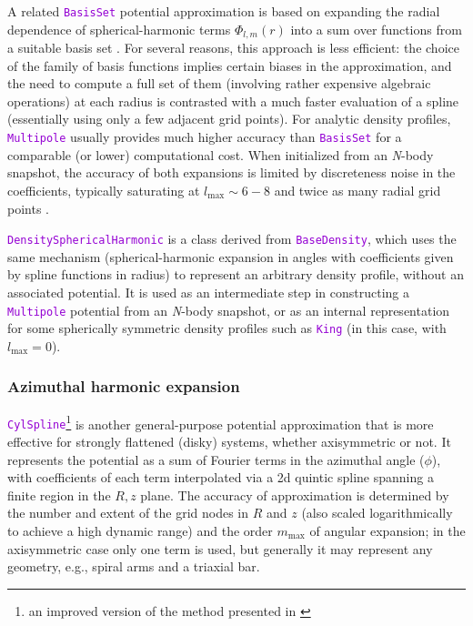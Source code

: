 \documentclass[12pt]{article}
\newcommand{\Nbody}{\textsl{N}-body\xspace}
\newcommand{\ttt}[1]{\textcolor{darkviolet}{\texttt{#1}}}
\begin{document}
A related \ttt{BasisSet} potential approximation is based on expanding the radial dependence of spherical-harmonic terms $\Phi_{l,m}(r)$ into a sum over functions from a suitable basis set \cite{HernquistOstriker1992,Zhao1996}. For several reasons, this approach is less efficient: the choice of the family of basis functions implies certain biases in the approximation, and the need to compute a full set of them (involving rather expensive algebraic operations) at each radius is contrasted with a much faster evaluation of a spline (essentially using only a few adjacent grid points). For analytic density profiles, \ttt{Multipole} usually provides much higher accuracy than \ttt{BasisSet} for a comparable (or lower) computational cost. When initialized from an \Nbody snapshot, the accuracy of both expansions is limited by discreteness noise in the coefficients, typically saturating at $l_\mathrm{max} \sim 6-8$ and twice as many radial grid points \cite{Sanders2020}.

\ttt{DensitySphericalHarmonic} is a class derived from \ttt{BaseDensity}, which uses the same mechanism (spherical-harmonic expansion in angles with coefficients given by spline functions in radius) to represent an arbitrary density profile, without an associated potential. It is used as an intermediate step in constructing a \ttt{Multipole} potential from an \Nbody snapshot, or as an internal representation for some spherically symmetric density profiles such as \ttt{King} (in this case, with $l_\mathrm{max}=0$).

\subsubsection{Azimuthal harmonic expansion}  \label{sec:PotentialCylSpline}

\ttt{CylSpline}\footnote{an improved version of the method presented in \cite{VasilievAthanassoula2015}} is another general-purpose potential approximation that is more effective for strongly flattened (disky) systems, whether axisymmetric or not. It represents the potential as a sum of Fourier terms in the azimuthal angle ($\phi$), with coefficients of each term interpolated via a 2d quintic spline spanning a finite region in the $R,z$ plane. The accuracy of approximation is determined by the number and extent of the grid nodes in $R$ and $z$ (also scaled logarithmically to achieve a high dynamic range) and the order $m_\mathrm{max}$ of angular expansion; in the axisymmetric case only one term is used, but generally it may represent any geometry, e.g., spiral arms and a triaxial bar.
\end{document}
